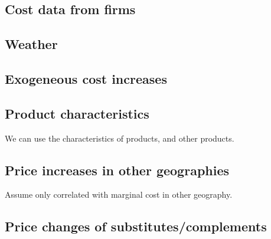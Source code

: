 

\subsection{Cost data from firms}

\subsection{Weather}

\subsection{Exogeneous cost increases}

\subsection{Product characteristics}

We can use the characteristics of products, and other products.

\subsection{Price increases in other geographies}

Assume only correlated with marginal cost in other geography.

\subsection{Price changes of substitutes/complements}


